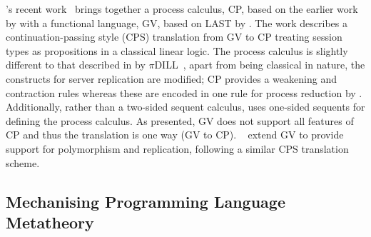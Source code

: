 \documentclass{mprop}
\begin{document}
\citeauthor{Wadler:2012}'s recent work~\cite{Wadler:2012} brings together a process calculus, CP, based on the earlier work by \citeauthor{Caires:2010:STI} with a functional language, GV, based on LAST by \citeauthor{Gay:2010:LAST}. The work describes a continuation-passing style (CPS) translation from GV to CP treating session types as propositions in a classical linear logic. The process calculus is slightly different to that described in by $\pi$DILL~\cite{Caires:2010:STI}, apart from being classical in nature, the constructs for server replication are modified; CP provides a weakening and contraction rules whereas these are encoded in one rule for process reduction by \citeauthor{Caires:2010:STI}. Additionally, rather than a two-sided sequent calculus, \citeauthor{Wadler:2012} uses one-sided sequents for defining the process calculus. As presented, GV does not support all features of CP and thus the translation is one way (GV to CP). \citeauthor{Lindley:2014:SAP}~\cite{Lindley:2014:SAP} extend GV to provide support for polymorphism and replication, following a similar CPS translation scheme.


\subsection{Mechanising Programming Language Metatheory}
\end{document}
